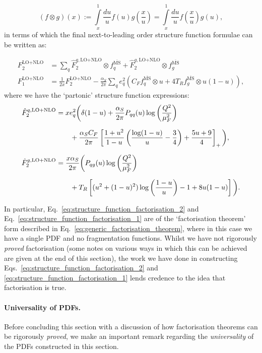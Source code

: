 \documentclass[withindex,glossary]{cam-thesis}
\begin{document}
\begin{equation}
(f \otimes g)(x) := \int\limits_{x}^{1} \frac{du}{u} f(u) g\left( \frac{x}{u} \right) = \int\limits_{x}^{1} \frac{du}{u} f\left( \frac{x}{u} \right) g(u),
\end{equation}
in terms of which the final next-to-leading order structure function formulae can be written as:
\begin{framed}
\begin{align}
\label{eq:structure_function_factorisation_2}
F_2^{\text{LO+NLO}} &=\sum_{q} \hat{F}_2^{q,\text{LO+NLO}} \otimes f_q^{\overline{\text{MS}}} + \hat{F}_2^{g,\text{LO+NLO}} \otimes f_g^{\overline{\text{MS}}} \\[1.5ex]
\label{eq:structure_function_factorisation_1}
F_1^{\text{LO+NLO}} &= \frac{1}{2x} F_2^{\text{LO+NLO}} - \frac{\alpha_S}{2\pi} \sum_{q} e_q^2 \left( C_F f_q^{\overline{\text{MS}}} \otimes u + 4T_R f_g^{\overline{\text{MS}}} \otimes u(1-u) \right),
\end{align}
where we have the `partonic' structure function expressions:
\begin{align}
\hat{F}_2^{q,\text{LO+NLO}} &= xe_q^2 \bigg( \delta(1-u) + \frac{\alpha_S}{2\pi} P_{qq}(u) \log\left( \frac{Q^2}{\mu_F^2} \right)\notag \\[1.5ex]
&\qquad + \frac{\alpha_S C_F}{2\pi} \left[ \frac{1+u^2}{1-u} \left( \frac{\log(1-u)}{u} - \frac{3}{4} \right) + \frac{5u + 9}{4}\right]_+\bigg), \\[1.5ex]
\hat{F}_2^{g,\text{LO+NLO}} &= \frac{x\alpha_S}{2\pi} \bigg( P_{qg}(u) \log\left( \frac{Q^2}{\mu_F^2}\right) \notag \\[1.5ex]
&\qquad + T_R \left[ (u^2 + (1-u)^2) \log\left( \frac{1-u}{u} \right) - 1 + 8u(1-u)\right] \bigg).
\end{align}
\end{framed}
\noindent In particular, Eq.~\eqref{eq:structure_function_factorisation_2} and Eq.~\eqref{eq:structure_function_factorisation_1} are of the `factorisation theorem' form described in Eq.~\eqref{eq:generic_factorisation_theorem}, where in this case we have a single PDF and no fragmentation functions. Whilst we have not rigorously \textit{proved} factorisation (some notes on various ways in which this can be achieved are given at the end of this section), the work we have done in constructing Eqs.~\eqref{eq:structure_function_factorisation_2} and \eqref{eq:structure_function_factorisation_1} lends credence to the idea that factorisation is true.

\paragraph{Universality of PDFs.} Before concluding this section with a discussion of how factorisation theorems can be rigorously \textit{proved}, we make an important remark regarding the \textit{universality} of the PDFs constructed in this section. 
\end{document}
